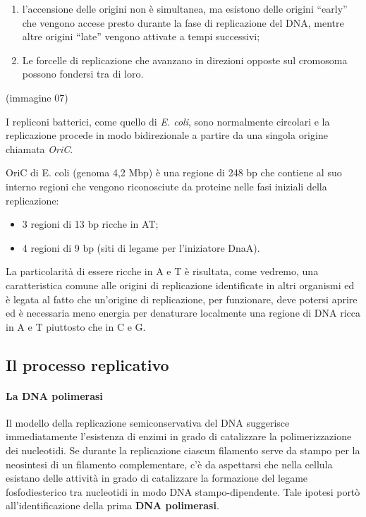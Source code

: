 \documentclass[11pt]{book}
\begin{document}
\begin{enumerate}
\def\labelenumi{\arabic{enumi}.}
\itemsep1pt\parskip0pt
\item
  l'accensione delle origini non è simultanea, ma esistono delle origini
  ``early'' che vengono accese presto durante la fase di replicazione
  del DNA, mentre altre origini ``late'' vengono attivate a tempi
  successivi;
\item
  Le forcelle di replicazione che avanzano in direzioni opposte sul
  cromosoma possono fondersi tra di loro.
\end{enumerate}

(immagine 07)

I repliconi batterici, come quello di \emph{E. coli}, sono normalmente
circolari e la replicazione procede in modo bidirezionale a partire da
una singola origine chiamata \emph{OriC}.

OriC di E. coli (genoma 4,2 Mbp) è una regione di 248 bp che contiene al
suo interno regioni che vengono riconosciute da proteine nelle fasi
iniziali della replicazione:

\begin{itemize}
\itemsep1pt\parskip0pt
\item
  3 regioni di 13 bp ricche in AT;
\item
  4 regioni di 9 bp (siti di legame per l'iniziatore DnaA).
\end{itemize}

La particolarità di essere ricche in A e T è risultata, come vedremo,
una caratteristica comune alle origini di replicazione identificate in
altri organismi ed è legata al fatto che un'origine di replicazione, per
funzionare, deve potersi aprire ed è necessaria meno energia per
denaturare localmente una regione di DNA ricca in A e T piuttosto che in
C e G.

\subsection{Il processo replicativo}\label{il-processo-replicativo}

\paragraph{La DNA polimerasi}\label{la-dna-polimerasi}

Il modello della replicazione semiconservativa del DNA suggerisce
immediatamente l'esistenza di enzimi in grado di catalizzare la
polimerizzazione dei nucleotidi. Se durante la replicazione ciascun
filamento serve da stampo per la neosintesi di un filamento
complementare, c'è da aspettarsi che nella cellula esistano delle
attività in grado di catalizzare la formazione del legame
fosfodiesterico tra nucleotidi in modo DNA stampo-dipendente. Tale
ipotesi portò all'identificazione della prima \textbf{DNA polimerasi}.
\end{document}
